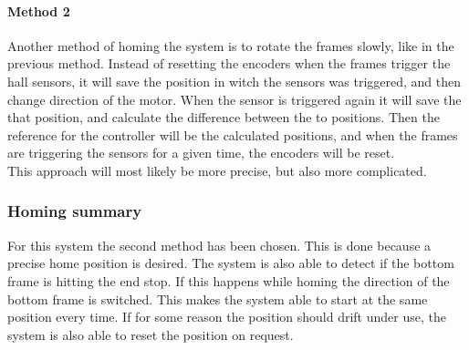 \documentclass[../../../main]{subfiles}
\begin{document}
\paragraph{Method 2}%
\label{par:method_2}
Another method of homing the system is to rotate the frames slowly, like in the previous method. 
Instead of resetting the encoders when the frames trigger the hall sensors, it will save the position in witch the sensors was triggered, and then change direction of the motor.
When the sensor is triggered again it will save the that position, and calculate the difference between the to positions. 
Then the reference for the controller will be the calculated positions, and when the frames are triggering the sensors for a given time, the encoders will be reset.
\\
This approach will most likely be more precise, but also more complicated. 



\subsubsection{Homing summary}%
\label{ssub:homing_summary}
For this system the second method has been chosen. This is done because a precise home position is desired.
The system is also able to detect if the bottom frame is hitting the end stop. If this happens while homing the direction of the bottom frame is switched.
This makes the system able to start at the same position every time.
If for some reason the position should drift under use, the system is also able to reset the position on request.
\end{document}
